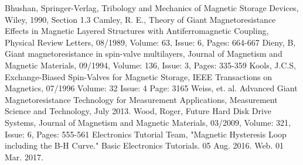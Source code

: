 \documentclass[11pt]{article}
\begin{document}
\begin{multicols}{2}
\begin{thebibliography}{9}
	{\footnotesize
	 Bhushan, Springer-Verlag, Tribology and Mechanics of Magnetic Storage Devices, Wiley, 1990, Section 1.3 
	 Camley, R. E., Theory of Giant Magnetoresistance Effects in Magnetic Layered Structures with Antiferromagnetic Coupling, Physical Review Letters, 08/1989, Volume: 63, Issue: 6, Pages: 664-667
	 Dieny, B, Giant magnetoresistance in spin-valve multilayers, Journal of Magnetism and Magnetic Materials, 09/1994, Volume: 136, Issue: 3, Pages: 335-359
	 Kools, J.C.S, Exchange-Biased Spin-Valves for Magnetic Storage, IEEE Transactions on Magnetics, 07/1996 Volume: 32 Issue: 4 Page: 3165
	Weiss, et. al. Advanced Giant Magnetoresistance Technology for Measurement Applications, Measurement Science and Technology, July 2013.  
	 Wood, Roger, Future Hard Disk Drive Systems, Journal of Magnetism and Magnetic Materials, 03/2009, Volume: 321, Issue: 6, Pages: 555-561
	 Electronics Tutorial Team, "Magnetic Hysteresis Loop including the B-H Curve." Basic Electronics Tutorials. 05 Aug. 2016. Web. 01 Mar. 2017.
	
	}
\end{thebibliography}

\end{multicols}%

\end{document}
